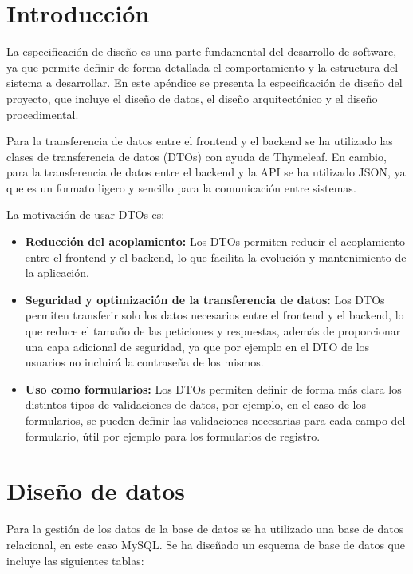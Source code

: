 
\section{Introducción}
La especificación de diseño es una parte fundamental del desarrollo de software, ya que permite definir de forma detallada el comportamiento y la estructura del sistema a desarrollar. En este apéndice se presenta la especificación de diseño del proyecto, que incluye el diseño de datos, el diseño arquitectónico y el diseño procedimental.

Para la transferencia de datos entre el frontend y el backend se ha utilizado las clases de transferencia de datos (DTOs) con ayuda de Thymeleaf. En cambio, para la transferencia de datos entre el backend y la API se ha utilizado JSON, ya que es un formato ligero y sencillo para la comunicación entre sistemas.

La motivación de usar DTOs es:
\begin{itemize}
    \item \textbf{Reducción del acoplamiento:} Los DTOs permiten reducir el acoplamiento entre el frontend y el backend, lo que facilita la evolución y mantenimiento de la aplicación.
    \item \textbf{Seguridad y optimización de la transferencia de datos:} Los DTOs permiten transferir solo los datos necesarios entre el frontend y el backend, lo que reduce el tamaño de las peticiones y respuestas, además de proporcionar una capa adicional de seguridad, ya que por ejemplo en el DTO de los usuarios no incluirá la contraseña de los mismos.
    \item \textbf{Uso como formularios:} Los DTOs permiten definir de forma más clara los distintos tipos de validaciones de datos, por ejemplo, en el caso de los formularios, se pueden definir las validaciones necesarias para cada campo del formulario, útil por ejemplo para los formularios de registro.
\end{itemize}



\section{Diseño de datos}

Para la gestión de los datos de la base de datos se ha utilizado una base de datos relacional, en este caso MySQL. Se ha diseñado un esquema de base de datos que incluye las siguientes tablas:

